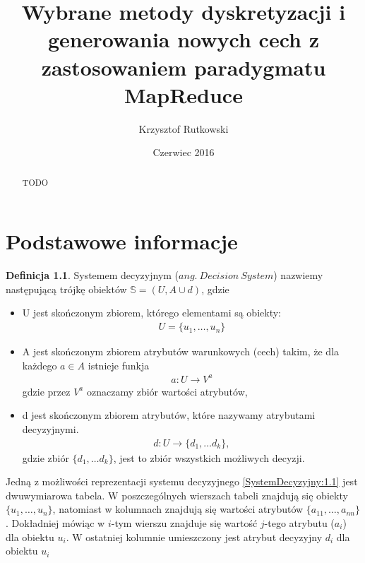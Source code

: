 \documentclass[magisterska]{pracamgr}
\author{Krzysztof Rutkowski}
\title{Wybrane metody dyskretyzacji i generowania nowych cech z zastosowaniem paradygmatu MapReduce}
\date{Czerwiec 2016}
\theoremstyle{plain}
\theoremstyle{definition}
\newtheorem{definicja}[thm]{Definicja}
\theoremstyle{remark}
\begin{document}
\maketitle

\begin{abstract}
TODO
\end{abstract}

\tableofcontents


\chapter{Podstawowe informacje}\label{r:pojecia}

\begin{definicja}
Systemem decyzyjnym ($ang. \ Decision \ System$) nazwiemy następującą
trójkę obiektów $\mathbb{S} = (U, A \cup d)$, gdzie
\begin{itemize}
 \item U jest skończonym zbiorem, którego elementami są obiekty:
    \begin{align*}
	    U = \{u_1, \ldots, u_n \}  
    \end{align*}

 \item A jest skończonym zbiorem atrybutów warunkowych (cech) takim, że dla każdego $ a \in A$ istnieje funkja
    \begin{align*}
	  a:U \rightarrow V^{a}
    \end{align*}
    gdzie przez $V^{a}$ oznaczamy zbiór wartości atrybutów,
    
 \item d jest skończonym zbiorem atrybutów, które nazywamy atrybutami decyzyjnymi.
    \begin{align*}
     d: U \rightarrow \{d_1, \ldots d_k\},
    \end{align*}
  gdzie zbiór $\{d_1, \ldots d_k\}$, jest to zbiór wszystkich możliwych decyzji.
\end{itemize}

\end{definicja}

Jedną z możliwości reprezentacji systemu decyzyjnego  \ref{SystemDecyzyjny:1.1} jest dwuwymiarowa tabela.
W poszczególnych wierszach tabeli znajdują się obiekty $\{u_1, \ldots, u_n \}$,
natomiast w kolumnach znajdują się wartości atrybutów $\{a_{11}, \ldots, a_{nn} \}$.
Dokładniej mówiąc w $i$-tym wierszu znajduje się wartość  $j$-tego atrybutu ($a_{i}$) dla obiektu $u_{i}$.
W ostatniej kolumnie umieszczony jest atrybut decyzyjny $d_{i}$ dla obiektu $u_i$
\end{document}
